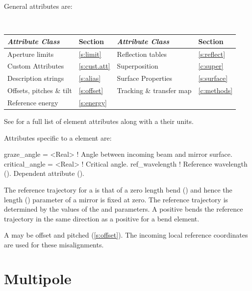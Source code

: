 {General  attributes are:
\begin{center}
\tt 
\begin{tabular}{llll} \toprule
  {\sl Attribute Class}      & Section           & {\sl Attribute Class}      & Section         \\ \midrule
  Aperture limits            & \ref{s:limit}     & Reflection tables          & \ref{s:reflect} \\
  Custom Attributes          & \ref{s:cust.att}  & Superposition              & \ref{c:super}   \\
  Description strings        & \ref{s:alias}     & Surface Properties         & \ref{s:surface} \\
  Offsets, pitches \& tilt   & \ref{s:offset}    & Tracking \& transfer map   & \ref{c:methods} \\ 
  Reference energy           & \ref{s:energy}    &                            &                 \\
  \bottomrule
\end{tabular}
\end{center}
\toffset
See  for a full list of element attributes along with a their units.

Attributes specific to a  element are:
\begin{example}
  graze_angle     = <Real>   ! Angle between incoming beam and mirror surface.
  critical_angle  = <Real>   ! Critical angle.
  ref_wavelength             ! Reference wavelength (). Dependent attribute ().
\end{example}

The reference trajectory for a
 is that of a zero length bend () and
hence the length () parameter of a mirror is fixed at zero. The
reference trajectory is determined by the values of the
 and  parameters. A positive 
bends the reference trajectory in the same direction as a positive
 for a bend element.

A  may be offset and pitched (\ref{s:offset}). The incoming
local reference coordinates are used for these misalignments.

\newpage

\section{Multipole}
\label{s:mult}

}
